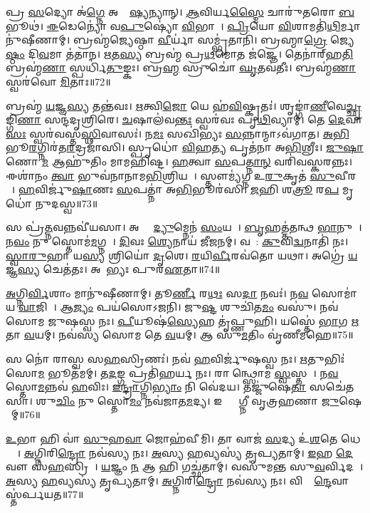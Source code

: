𑌪𑍍𑌰 \ul{𑌸}𑌦𑍍𑌯𑍋 𑌅॑\ul{𑌗𑍍𑌨𑍇} 𑌅𑌤𑍍𑌯𑍇᳚\ul{𑌷𑍍𑌯}𑌨𑍍𑌯𑌾𑌨𑍍।
\ul{𑌆}𑌵𑌿𑌰𑍍𑌯\ul{𑌸𑍍𑌮𑍈} 𑌚𑌾𑌰𑍁॑𑌤𑌰𑍋 \ul{𑌬}𑌭𑍂𑌥॑।
\ul{𑌈}𑌡𑍇𑌨𑍍𑌯𑍋॑ 𑌵\ul{𑌪𑍁}𑌷𑍍𑌯𑍋॑ \ul{𑌵𑌿}𑌭𑌾𑌵𑌾᳚।
\ul{𑌪𑍍𑌰𑌿}𑌯𑍋 \ul{𑌵𑌿}𑌶𑌾𑌮𑌤𑌿॑\ul{𑌥𑌿}𑌰𑍍𑌮𑌾𑌨𑍁॑𑌷𑍀𑌣𑌾𑌮𑍍।
𑌬𑍍𑌰𑌹𑍍𑌮॑𑌜𑍍𑌯𑍇𑌷𑍍𑌠𑌾 \ul{𑌵𑍀}𑌰𑍍𑌯𑌾॑ 𑌸𑌮𑍍𑌭𑍃॑𑌤𑌾𑌨𑌿।
𑌬𑍍𑌰𑌹𑍍𑌮𑌾\ul{𑌗𑍍𑌰𑍇} 𑌜𑍍𑌯𑍇\ul{𑌷𑍍𑌠𑌂} 𑌦𑌿\ul{𑌵}𑌮𑌾 𑌤॑𑌤𑌾𑌨।
\ul{𑌋}𑌤\ul{𑌸𑍍𑌯} 𑌬𑍍𑌰𑌹𑍍𑌮॑ 𑌪𑍍𑌰\ul{𑌥}𑌮𑍋𑌤 𑌜॑𑌜𑍍𑌞𑍇।
𑌤𑍇𑌨𑌾॑𑌰𑍍‌\mbox{}𑌹\ul{𑌤𑌿} 𑌬𑍍𑌰𑌹𑍍𑌮॑\ul{𑌣𑌾} 𑌸𑍍𑌪𑌰𑍍𑌧𑌿॑\ul{𑌤𑍁}𑌙𑍍𑌕𑌃।
𑌬𑍍𑌰\ul{𑌹𑍍𑌮} 𑌸𑍍𑌰𑍁𑌚𑍋॑ \ul{𑌘𑍃}𑌤𑌵॑𑌤𑍀𑌃।
𑌬𑍍𑌰𑌹𑍍𑌮॑\ul{𑌣𑌾} 𑌸𑍍𑌵𑌰॑𑌵𑍋 \ul{𑌮𑌿}𑌤𑌾𑌃॥72॥

𑌬𑍍𑌰𑌹𑍍𑌮॑ \ul{𑌯}𑌜𑍍𑌞\ul{𑌸𑍍𑌯} 𑌤𑌨𑍍𑌤॑𑌵𑌃।
\ul{𑌋}𑌤𑍍𑌵𑌿\ul{𑌜𑍋} 𑌯𑍇 𑌹॑\ul{𑌵𑌿}𑌷𑍍𑌕𑍃𑌤𑌃॑।
𑌶𑍃𑌙𑍍𑌗𑌾॑\ul{𑌣𑍀}𑌵𑍇\ul{𑌚𑍍𑌛𑍃}𑌙𑍍𑌗𑌿\ul{𑌣𑌾}\ul{} 𑌸𑌨𑍍𑌦॑𑌦𑍃𑌶𑍍𑌰𑌿𑌰𑍇।
\ul{𑌚}𑌷𑌾𑌲॑𑌵\ul{𑌨𑍍𑌤𑌃} 𑌸𑍍𑌵𑌰॑𑌵𑌃 𑌪𑍃\ul{𑌥𑌿}𑌵𑍍𑌯𑌾𑌮𑍍।
𑌤𑍇 \ul{𑌦𑍇}𑌵𑌾\ul{𑌸𑌃} 𑌸𑍍𑌵𑌰॑𑌵𑌸𑍍𑌤\ul{𑌸𑍍𑌥𑌿}𑌵𑌾𑌸𑌃॑।
𑌨\ul{𑌮𑌃} 𑌸𑌖𑌿॑𑌭𑍍𑌯𑌃 \ul{𑌸}𑌨𑍍𑌨𑌾𑌨𑍍𑌮𑌾\-𑌽𑌵॑𑌗𑌾𑌤।
\ul{𑌅}\ul{𑌭𑌿}𑌭𑍂\ul{𑌰}𑌗𑍍𑌨𑌿𑌰॑𑌤\ul{𑌰}𑌦𑍍𑌰𑌜𑌾॑𑌸𑌿।
𑌸𑍍𑌪𑍃𑌧𑍋॑ \ul{𑌵𑌿}𑌹\ul{𑌤𑍍𑌯} 𑌪𑍃𑌤॑𑌨𑌾 𑌅\ul{𑌭𑌿}𑌶𑍍𑌰𑍀𑌃।
\ul{𑌜𑍁}\ul{𑌷𑌾}𑌣𑍋 \ul{𑌮} 𑌆𑌹𑍁॑𑌤𑌿𑌂 𑌮𑌾𑌮𑌹𑌿𑌷𑍍𑌟।
\ul{𑌹}𑌤𑍍𑌵𑌾 \ul{𑌸}𑌪\ul{𑌤𑍍𑌨𑌾}\ul{𑌨𑍍} 𑌵𑌰𑌿॑𑌵𑌸𑍍𑌕𑌰𑌨𑍍𑌨𑌃।
𑌈𑌶𑌾॑𑌨𑌂 \ul{𑌤𑍍𑌵𑌾} 𑌭𑍁𑌵॑𑌨𑌾𑌨𑌾𑌮\ul{𑌭𑌿}𑌶𑍍𑌰𑌿𑌯𑌮𑍍᳚।
𑌸𑍍𑌤𑍗𑌮𑍍𑌯॑𑌗𑍍𑌨 𑌉\ul{𑌰𑍁}𑌕𑍃𑌤॑ \ul{𑌸𑍁}𑌵𑍀𑌰𑌮𑍍᳚।
\ul{𑌹}𑌵𑌿𑌰𑍍𑌜𑍁॑\ul{𑌷𑌾}𑌣𑌃 \ul{𑌸}𑌪𑌤𑍍𑌨𑌾॑ 𑌅\ul{𑌭𑌿}𑌭𑍂𑌰॑𑌸𑌿।
\ul{𑌜}𑌹𑌿 𑌶\ul{𑌤𑍍𑌰𑍂}\ul{} 𑌰\ul{𑌪} 𑌮𑍃𑌧𑍋॑ 𑌨𑍁𑌦𑌸𑍍𑌵॥73॥\anuvakamend[\ul{𑌵𑌿}𑌶𑌾𑌂 𑌜॑𑌯𑌾𑌮𑌸𑌿 𑌜𑍀𑌰𑌦𑌾\ul{𑌨𑍋} 𑌹\ul{𑌰𑍍𑌯𑌾} 𑌵𑌿\ul{𑌶𑍍𑌵𑌾} 𑌦𑌿𑌵𑌿॑𑌷𑍍𑌟𑌿\ul{𑌷𑍁} 𑌵𑌸𑍂॑𑌨𑌿 𑌜𑌿\ul{𑌗𑍀}𑌵𑌾𑌨𑍍𑌥𑍍𑌸𑌹𑍋॑𑌭𑌿\ul{𑌰𑍍𑌮𑌿}𑌤𑌾 𑌨॑\ul{𑌶𑍍𑌚}𑌤𑍍𑌵𑌾𑌰𑌿॑ 𑌚]

𑌸 𑌪𑍍𑌰॑\ul{𑌤𑍍𑌨}𑌵𑌨𑍍𑌨𑌵𑍀॑𑌯𑌸𑌾।
𑌅𑌗𑍍𑌨𑍇᳚ \ul{𑌦𑍍𑌯𑍁}𑌮𑍍𑌨𑍇𑌨॑ \ul{𑌸𑌂}𑌯𑌤𑌾᳚।
\ul{𑌬𑍃}𑌹𑌤𑍍𑌤॑𑌤𑌨𑍍𑌥 \ul{𑌭𑌾}𑌨𑍁𑌨𑌾᳚।
𑌨\ul{𑌵𑌂} 𑌨𑍁 𑌸𑍍𑌤𑍋𑌮॑\ul{𑌮}𑌗𑍍𑌨𑌯𑍇᳚।
\ul{𑌦𑌿}𑌵𑌃 \ul{𑌶𑍍𑌯𑍇}𑌨𑌾𑌯॑ 𑌜𑍀𑌜𑌨𑌮𑍍।
𑌵𑌸𑍋᳚: \ul{𑌕𑍁}𑌵𑌿\ul{𑌦𑍍𑌵}𑌨𑌾𑌤𑌿॑ 𑌨𑌃।
\ul{𑌸𑍍𑌵𑌾}\ul{𑌰𑍁}𑌹𑌾 𑌯\ul{𑌸𑍍𑌯} 𑌶𑍍𑌰𑌿𑌯𑍋॑ \ul{𑌦𑍃}𑌶𑍇।
\ul{𑌰}𑌯𑌿\ul{𑌰𑍍𑌵𑍀}𑌰𑌵॑𑌤𑍋 𑌯𑌥𑌾।
𑌅𑌗𑍍𑌰𑍇॑ \ul{𑌯}𑌜𑍍𑌞\ul{𑌸𑍍𑌯} 𑌚𑍇𑌤॑𑌤𑌃।
𑌅𑌦𑌾᳚𑌭𑍍𑌯𑌃 𑌪𑍁𑌰\ul{𑌏}𑌤𑌾॥74॥

\ul{𑌅}𑌗𑍍𑌨𑌿\ul{𑌰𑍍𑌵𑌿}𑌶𑌾𑌂 𑌮𑌾𑌨𑍁॑𑌷𑍀𑌣𑌾𑌮𑍍।
𑌤𑍂\ul{𑌰𑍍𑌣𑍀} 𑌰\ul{𑌥𑌃} 𑌸\ul{𑌦𑌾} 𑌨𑌵𑌃॑।
𑌨\ul{𑌵}\ul{} 𑌸𑍋𑌮𑌾॑𑌯 \ul{𑌵𑌾}𑌜𑌿𑌨𑍇᳚।
𑌆\ul{𑌜𑍍𑌯𑌂} 𑌪𑌯॑𑌸𑍋𑌽𑌜𑌨𑌿।
𑌜𑍁\ul{𑌷𑍍𑌟}\ul{} 𑌶𑍁𑌚𑌿॑𑌤\ul{𑌮𑌂} 𑌵𑌸𑍁॑।
𑌨𑌵॑ 𑌸𑍋𑌮 𑌜𑍁𑌷𑌸𑍍𑌵 𑌨𑌃।
\ul{𑌪𑍀}𑌯𑍂𑌷॑\ul{𑌸𑍍𑌯𑍇}𑌹 𑌤𑍃॑𑌪𑍍𑌣𑍁𑌹𑌿।
𑌯𑌸𑍍𑌤𑍇॑ \ul{𑌭𑌾}𑌗 \ul{𑌋}𑌤𑌾 \ul{𑌵}𑌯𑌮𑍍।
𑌨𑌵॑𑌸𑍍𑌯 𑌸𑍋𑌮 𑌤𑍇 \ul{𑌵}𑌯𑌮𑍍।
𑌆 𑌸𑍁॑\ul{𑌮}𑌤𑌿𑌂 𑌵𑍃॑𑌣𑍀𑌮𑌹𑍇॥75॥

𑌸 𑌨𑍋॑ 𑌰𑌾𑌸𑍍𑌵 𑌸\ul{𑌹}𑌸𑍍𑌰𑌿𑌣𑌃॑।
𑌨𑌵॑ \ul{𑌹}𑌵𑌿𑌰𑍍𑌜𑍁॑𑌷𑌸𑍍𑌵 𑌨𑌃।
\ul{𑌋}𑌤𑍁𑌭𑌿𑌃॑ 𑌸𑍋\ul{𑌮} 𑌭𑍂𑌤॑𑌮𑌮𑍍।
𑌤\ul{𑌦}𑌙𑍍𑌗 𑌪𑍍𑌰𑌤𑌿॑\-𑌹𑌰𑍍𑌯 𑌨𑌃।
𑌰𑌾𑌜᳚𑌨𑍍𑌥𑍍𑌸𑍋𑌮 \ul{𑌸𑍍𑌵}𑌸𑍍𑌤𑌯𑍇᳚।
𑌨\ul{𑌵}\ul{}𑌸𑍍𑌤𑍋\ul{𑌮}𑌨𑍍𑌨𑌵॑ \ul{𑌹}𑌵𑌿𑌃।
\ul{𑌇}\ul{𑌨𑍍𑌦𑍍𑌰𑌾}𑌗𑍍𑌨𑌿\ul{𑌭𑍍𑌯𑌾𑌂} 𑌨𑌿 𑌵𑍇॑𑌦𑌯।
𑌤𑌜𑍍𑌜𑍁॑𑌷𑍇\ul{𑌤𑌾}\ul{} 𑌸𑌚𑍇॑𑌤𑌸𑌾।
𑌶𑍁\ul{𑌚𑌿𑌂} 𑌨𑍁 𑌸𑍍𑌤𑍋\ul{𑌮𑌂} 𑌨𑌵॑𑌜𑌾𑌤\ul{𑌮}𑌦𑍍𑌯।
𑌇𑌨𑍍𑌦𑍍𑌰𑌾᳚𑌗𑍍𑌨𑍀 𑌵𑍃𑌤𑍍𑌰𑌹𑌣𑌾 \ul{𑌜𑍁}𑌷𑍇𑌥𑌾᳚𑌮𑍍॥76॥

\ul{𑌉}𑌭𑌾 𑌹𑌿 𑌵𑌾॑ \ul{𑌸𑍁}𑌹\ul{𑌵𑌾} 𑌜𑍋𑌹॑𑌵𑍀𑌮𑌿।
𑌤𑌾 𑌵𑌾𑌜॑ \ul{𑌸}𑌦𑍍𑌯 𑌉॑\ul{𑌶}𑌤𑍇 𑌧𑍇𑌷𑍍𑌠𑌾᳚।
\ul{𑌅}𑌗𑍍𑌨𑌿𑌰𑌿\ul{𑌨𑍍𑌦𑍍𑌰𑍋} 𑌨𑌵॑𑌸𑍍𑌯 𑌨𑌃।
\ul{𑌅}𑌸𑍍𑌯 \ul{𑌹}𑌵𑍍𑌯𑌸𑍍𑌯॑ 𑌤𑍃𑌪𑍍𑌯𑌤𑌾𑌮𑍍।
\ul{𑌇}𑌹 \ul{𑌦𑍇}𑌵𑍗 𑌸॑\ul{𑌹}𑌸𑍍𑌰𑌿𑌣𑍗᳚।
\ul{𑌯}𑌜𑍍𑌞𑌂 \ul{𑌨} 𑌆 𑌹𑌿 𑌗𑌚𑍍𑌛॑𑌤𑌾𑌮𑍍।
𑌵𑌸𑍁॑𑌮𑌨𑍍𑌤 𑌸𑍁\ul{𑌵}𑌰𑍍𑌵𑌿𑌦𑌮𑍍᳚।
\ul{𑌅}𑌸𑍍𑌯 \ul{𑌹}𑌵𑍍𑌯𑌸𑍍𑌯॑ 𑌤𑍃𑌪𑍍𑌯𑌤𑌾𑌮𑍍।
\ul{𑌅}𑌗𑍍𑌨𑌿𑌰𑌿\ul{𑌨𑍍𑌦𑍍𑌰𑍋} 𑌨𑌵॑𑌸𑍍𑌯 𑌨𑌃।
𑌵𑌿𑌶𑍍𑌵𑌾᳚\ul{𑌨𑍍𑌦𑍇}𑌵𑌾𑌸𑍍𑌤॑𑌰𑍍𑌪𑌯𑌤॥77॥

